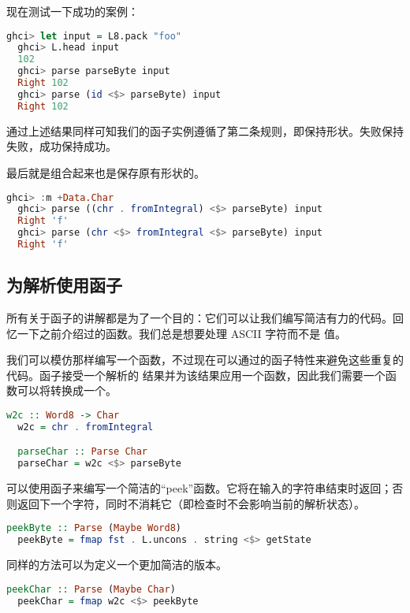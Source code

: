 \documentclass[./main.tex]{subfiles}
\begin{document}
现在测试一下成功的案例：

\begin{lstlisting}[language=Haskell]
  ghci> let input = L8.pack "foo"
  ghci> L.head input
  102
  ghci> parse parseByte input
  Right 102
  ghci> parse (id <$> parseByte) input
  Right 102
\end{lstlisting}

通过上述结果同样可知我们的函子实例遵循了第二条规则，即保持形状。失败保持失败，成功保持成功。

最后就是组合起来也是保存原有形状的。

\begin{lstlisting}[language=Haskell]
  ghci> :m +Data.Char
  ghci> parse ((chr . fromIntegral) <$> parseByte) input
  Right 'f'
  ghci> parse (chr <$> fromIntegral <$> parseByte) input
  Right 'f'
\end{lstlisting}

\subsection*{为解析使用函子}

所有关于函子的讲解都是为了一个目的：它们可以让我们编写简洁有力的代码。回忆一下之前介绍过的函数。我们总是想要处理 ASCII 字符而不是
值。

我们可以模仿那样编写一个函数，不过现在可以通过的函子特性来避免这些重复的代码。函子接受一个解析的
结果并为该结果应用一个函数，因此我们需要一个函数可以将转换成一个。

\begin{lstlisting}[language=Haskell]
  w2c :: Word8 -> Char
  w2c = chr . fromIntegral

  parseChar :: Parse Char
  parseChar = w2c <$> parseByte
\end{lstlisting}

可以使用函子来编写一个简洁的“peek”函数。它将在输入的字符串结束时返回；否则返回下一个字符，同时不消耗它（即检查时不会影响当前的解析状态）。

\begin{lstlisting}[language=Haskell]
  peekByte :: Parse (Maybe Word8)
  peekByte = fmap fst . L.uncons . string <$> getState
\end{lstlisting}

同样的方法可以为定义一个更加简洁的版本。

\begin{lstlisting}[language=Haskell]
  peekChar :: Parse (Maybe Char)
  peekChar = fmap w2c <$> peekByte
\end{lstlisting}
\end{document}
